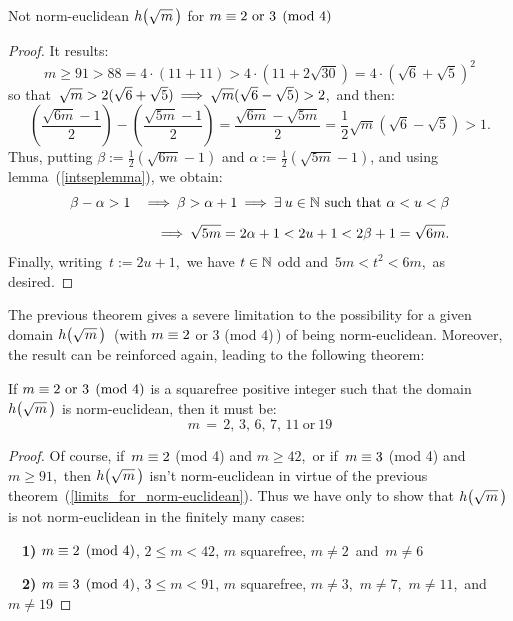 \begin{subsection}{Not norm-euclidean $\hh{m}$ for %
                   $m \equiv 2 \text{ or } 3 \pmod 4$}
\begin{proof}
\smallskip
It results:
$$
m \geq 91 > 88 = 4 \cdot (11 + 11) > 4 \cdot
\left(11 + 2\sqrt{30}\right) = 4 \cdot \left(\sqrt{6} +
\sqrt{5}\right)^2
$$
so that\, $\sqrt{m} > 2(\sqrt{6} + \sqrt{5}) \:\Longrightarrow\:
\sqrt{m}(\sqrt{6} - \sqrt{5}) > 2$,\, and then:
$$
\left(\frac{\sqrt{6m} - 1}{2}\right) -
\left(\frac{\sqrt{5m} - 1}{2}\right) =
\frac{\sqrt{6m} - \sqrt{5m}}{2} = 
\frac{1}{2}\sqrt{m} \left(\sqrt{6}-\sqrt{5}\right) > 1.
$$
%
Thus, putting
$\beta:= \frac{1}{2} \left(\sqrt{6m} - 1\right)$
and
$\alpha:= \frac{1}{2} \left(\sqrt{5m} - 1\right)$,
and using lemma~(\ref{intseplemma}), we obtain:
\begin{eqnarray*}
& \beta - \alpha > 1 & \:\Longrightarrow\: \beta > \alpha + 1 \:\Longrightarrow\:
\exists\: u \in \mathbb{N}\ \textrm{such that}\ \alpha < u <
\beta 
\\[5pt]
& & \:\Longrightarrow\: \sqrt{5m} = 2 \alpha + 1 < 2u + 1 <
2 \beta + 1 = \sqrt{6m}.
\end{eqnarray*}
Finally, writing\, $t:= 2u + 1$,\, we have $t \in \mathbb{N}$ odd
and\, $5m < t^2 < 6m$,\, as desired.
%
\end{proof}

\smallskip
The previous theorem gives a severe limitation to the
possibility for a given domain $\hh{m}$\,
(with $m \equiv 2$ or $3$ (mod $4$)\,) of being
norm-euclidean. Moreover, the result can be reinforced
again, leading to the following theorem:
\begin{thm}%
\label{first_partial_classification_of_norm-euclidean_domains}
If $m \equiv 2 \text{ or } 3 \pmod 4$ is a squarefree
positive integer such that the domain $\hh{m}$ is norm-euclidean,
then it must be:
$$ m\, = \,2,\, 3,\, 6,\, 7,\, 11\ \text{or}\ 19 $$
\end{thm}

\begin{proof}
Of course, if\, $m \equiv 2$ (mod 4) and $m \geq 42$,\,
or if\, $m \equiv 3$ (mod 4) and $m \geq 91$,\, then
$\hh{m}$ isn't norm-euclidean in virtue of
the previous theorem~(\ref{limits_for_norm-euclidean}).
Thus we have only to show that $\hh{m}$ is not norm-euclidean
in the finitely many cases:

~~\textbf{1)}\:
$m \equiv 2 \pmod 4$,\:
$2 \leq m < 42$,\:
$m$ squarefree,\:
$m \neq 2$\, and\, $m \neq 6$

~~\textbf{2)}\:
$m \equiv 3 \pmod 4$,\:
$3 \leq m < 91$,\:
$m$ squarefree,\:
$m \neq 3$,\, $m \neq 7$,\,
$m \neq 11$,\, and \,$m \neq 19$


\end{proof}
\end{subsection}

